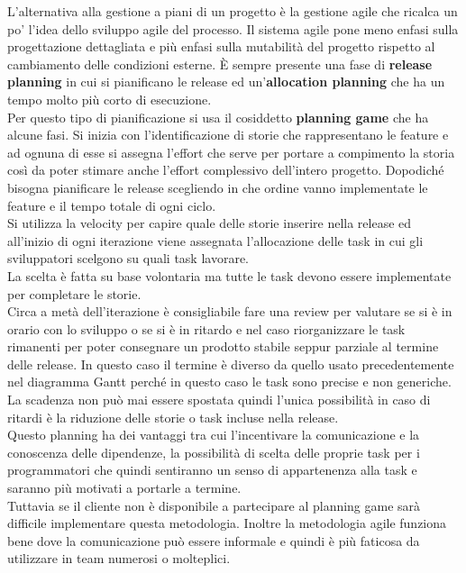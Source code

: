 L'alternativa alla gestione a piani di un progetto è la gestione agile che ricalca un po' l'idea dello sviluppo agile del processo.
Il sistema agile pone meno enfasi sulla progettazione dettagliata e più enfasi sulla mutabilità del progetto rispetto al cambiamento delle condizioni esterne.
È sempre presente una fase di \textbf{release planning} in cui si pianificano le release ed un'\textbf{allocation planning} che ha un tempo molto più corto di esecuzione.\\
Per questo tipo di pianificazione si usa il cosiddetto \textbf{planning game} che ha alcune fasi.
Si inizia con l'identificazione di storie che rappresentano le feature e ad ognuna di esse si assegna l'effort che serve per portare a compimento la storia così da poter stimare anche l'effort complessivo dell'intero progetto.
Dopodiché bisogna pianificare le release scegliendo in che ordine vanno implementate le feature e il tempo totale di ogni ciclo.\\
Si utilizza la velocity per capire quale delle storie inserire nella release ed all'inizio di ogni iterazione viene assegnata l'allocazione delle task in cui gli sviluppatori scelgono su quali task lavorare.\\
La scelta è fatta su base volontaria ma tutte le task devono essere implementate per completare le storie.\\
Circa a metà dell'iterazione è consigliabile fare una review per valutare se si è in orario con lo sviluppo o se si è in ritardo e nel caso riorganizzare le task rimanenti per poter consegnare un prodotto stabile seppur parziale al termine delle release.
In questo caso il termine  è diverso da quello usato precedentemente nel diagramma Gantt perché in questo caso le task sono precise e non generiche.\\
La scadenza non può mai essere spostata quindi l'unica possibilità in caso di ritardi è la riduzione delle storie o task incluse nella release.\\
Questo planning ha dei vantaggi tra cui l'incentivare la comunicazione e la conoscenza delle dipendenze, la possibilità di scelta delle proprie task per i programmatori che quindi sentiranno un senso di appartenenza alla task e saranno più motivati a portarle a termine.\\
Tuttavia se il cliente non è disponibile a partecipare al planning game sarà difficile implementare questa metodologia.
Inoltre la metodologia agile funziona bene dove la comunicazione può essere informale e quindi è più faticosa da utilizzare in team numerosi o molteplici.\\
